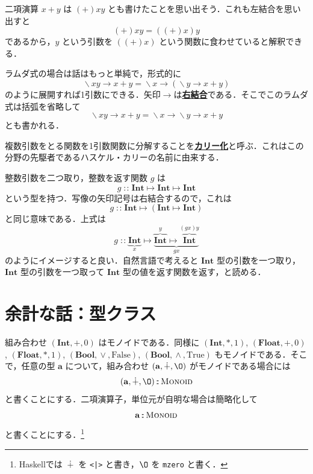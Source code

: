 \documentclass[a4paper,twocolumn]{jsbook}
\newcommand{\programminglanguage}[1]{\textsf{#1}}
\newcommand{\haskell}{\programminglanguage{Haskell}}
\newcommand{\keyword}[1]{{\underline{\textbf{#1}}}}
\newcommand{\code}[1]{\texttt{#1}}
\newcommand{\mSpecialConst}[1]{\mathrm{#1}} %
\newcommand{\mFalse}{\mSpecialConst{False}}
\newcommand{\mTrue}{\mSpecialConst{True}}
\newcommand{\mZero}{\O}
\DeclareMathOperator{\mIn}{{:\!:}}
\DeclareMathOperator{\mLambda}{\backslash}
\DeclareMathOperator{\mLambdaArrow}{\rightarrow}
\DeclareMathOperator{\mLogicalAnd}{\wedge}
\DeclareMathOperator{\mLogicalOr}{\vee}
\DeclareMathOperator{\mMapsTo}{\mapsto}
\DeclareMathOperator{\mPlus}{\dotplus}
\newcommand{\mType}[1]{\mathbf{#1}}
\newcommand{\mTupleWith}[1]{\left(#1\right)}
\newcommand{\mBoolType}{\mType{Bool}}
\newcommand{\mFloatType}{\mType{Float}}
\newcommand{\mIntType}{\mType{Int}}
\newcommand{\mSpecialTypeClass}[1]{\textsc{#1}} %
\newcommand{\mMonoidTypeClass}{\mSpecialTypeClass{Monoid}}
\newcommand{\mLambdaExp}[2]{\mLambda{#1}\mLambdaArrow{#2}}
\newcommand{\mProj}[2]{#1\mMapsTo#2}
\begin{document}
二項演算 $x+y$ は $(+)xy$ とも書けたことを思い出そう．これも左結合を思い出すと
\begin{equation}
(+)xy=\left((+)x\right)y
\end{equation}
であるから，$y$ という引数を $\left((+)x\right)$ という関数に食わせていると解釈できる．

ラムダ式の場合は話はもっと単純で，形式的に
\begin{equation}
\mLambdaExp{xy}{x+y}
=\mLambdaExp{x}{\left(\mLambdaExp{y}{x+y}\right)}
\end{equation}
のように展開すれば1引数にできる．矢印$\mLambdaArrow$は\keyword{右結合}である．そこでこのラムダ式は括弧を省略して
\begin{equation}
\mLambdaExp{xy}{x+y}
=\mLambdaExp{x}{\mLambdaExp{y}{x+y}}
\end{equation}
とも書かれる．

複数引数をとる関数を1引数関数に分解することを\keyword{カリー化}と呼ぶ．これはこの分野の先駆者であるハスケル・カリーの名前に由来する．


整数引数を二つ取り，整数を返す関数 $g$ は
\begin{equation}
g\mIn\mProj{\mIntType}{\mProj{\mIntType}{\mIntType}}
\end{equation}
という型を持つ．写像の矢印記号は右結合するので，これは
\begin{equation}
g\mIn\mProj{\mIntType}{\left(\mProj{\mIntType}{\mIntType}\right)}
\end{equation}
と同じ意味である．上式は
\begin{equation*}
g\mIn
\underbrace{\mIntType}_x
\mMapsTo
\underbrace{\overbrace{\mIntType}^y
\mMapsTo\overbrace{\mIntType}^{(gx)y}}_{gx}
\end{equation*}
のようにイメージすると良い．自然言語で考えると $\mIntType$ 型の引数を一つ取り，$\mIntType$ 型の引数を一つ取って $\mIntType$ 型の値を返す関数を返す，と読める．


\section{余計な話：型クラス}

組み合わせ $\mTupleWith{\mIntType,+,0}$ はモノイドである．同様に $\mTupleWith{\mIntType,*,1}$, $\mTupleWith{\mFloatType,+,0}$, $\mTupleWith{\mFloatType,*,1}$, $\mTupleWith{\mBoolType,\mLogicalOr,\mFalse}$, $\mTupleWith{\mBoolType,\mLogicalAnd,\mTrue}$ もモノイドである．そこで，任意の型 $\mType{a}$ について，組み合わせ $\mTupleWith{\mType{a},\mPlus,\mZero}$ がモノイドである場合には
\begin{equation}
\mTupleWith{\mType{a},\mPlus,\mZero}\mIn\mMonoidTypeClass
\end{equation}
と書くことにする．二項演算子，単位元が自明な場合は簡略化して
\begin{equation}
\mType{a}\mIn\mMonoidTypeClass
\end{equation}
と書くことにする．\footnote{\haskell では $\mPlus$ を \code{<|>} と書き，$\mZero$ を \code{mzero} と書く．}
\end{document}
